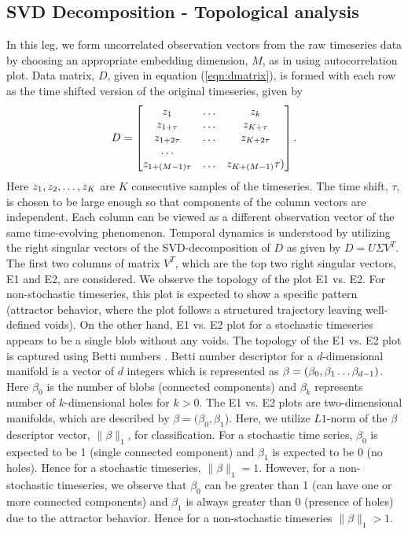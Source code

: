 \documentclass[journal]{IEEEtran}
\begin{document}
	\subsection{SVD Decomposition - Topological analysis}
	In this leg, we form uncorrelated observation vectors from the raw timeseries data  by choosing an appropriate embedding dimension, $M$, as in \cite{misra2006} using autocorrelation plot. Data matrix, $D$, given in equation (\ref{eqn:dmatrix}), is formed with each row  as the  time shifted version of the original timeseries, given by
	\begin{equation} \label{eqn:dmatrix}
		D= \begin{bmatrix} z_1  & \mathellipsis & z_k \\
			   z_{1 + \tau} &  \mathellipsis & z_{K + \tau}\\
		       z_{1 + 2\tau} &  \mathellipsis &z_{K + 2\tau} \\
			   \mathellipsis \\
			   z_{1 + (M-1)\tau} & \mathellipsis & z_{K + (M-1)}\tau)\\
		\end{bmatrix}.
		\end{equation}
	Here $z_{1}, z_{2}, \mathellipsis, z_{K}$ are $K$ consecutive samples of the timeseries. The time shift, $\tau$, is chosen to be large enough so that components of the column vectors are independent. Each column can be viewed as a different observation vector of the same time-evolving phenomenon. Temporal dynamics is understood by utilizing the right singular vectors of the SVD-decomposition of $D$ as given by $D = U \Sigma V^T$. The first two columns of matrix $V^T$, which are the top two right singular vectors, E1 and E2, are considered. We observe the topology of the plot E1 vs. E2. For non-stochastic timeseries, this plot is expected to show a specific pattern (attractor behavior, where the plot follows a structured trajectory leaving  well-defined voids). On the other hand, E1 vs. E2 plot for a stochastic timeseries appears to be a single blob without any voids. The topology of the E1 vs. E2 plot is captured using Betti numbers \cite{jmlr}. Betti number descriptor for a $d$-dimensional manifold is a vector of $d$ integers which is represented as $\beta = (\beta_0, \beta_1 \mathellipsis \beta_{d-1})$. Here $\beta_{0}$ is the number of blobs (connected components) and $\beta_k$ represents number of $k$-dimensional holes for $k>0$.  The E1 vs. E2 plots are two-dimensional manifolds, which are described by  $\beta=(\beta_{0}, \beta_{1}$). Here, we utilize $L1$-norm of the $\beta$ descriptor vector, $\|\beta\|_1$, for classification.  For a stochastic time series, $\beta_{0}$  is expected to be 1 (single connected component) and $\beta_1$ is expected to be 0 (no holes). Hence for a stochastic timeseries, $\|\beta\|_1 = 1$. However, for a non-stochastic timeseries, we observe that $\beta_{0}$ can be greater than 1 (can have one or more connected components) and $\beta_1$ is always greater than 0 (presence of holes) due to the attractor behavior. Hence for a non-stochastic timeseries $\|\beta\|_1 > 1$.
	
\end{document}
